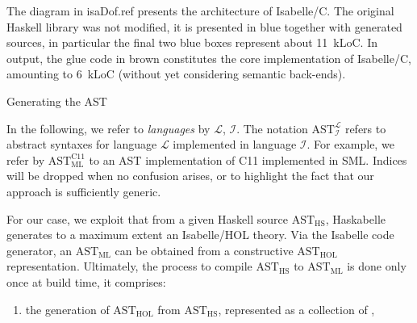 \begin{isabellebody}
\begin{isamarkupfigure*}
\end{isamarkupfigure*}\isamarkuptrue%
%
\begin{isamarkuptext}%
The diagram in \csname isaDof.ref presents the architecture of
Isabelle/C. The original Haskell library was not modified, it is presented in blue together with
generated sources, in particular the final two blue boxes represent about 11~kLoC. In output, the
glue code in brown constitutes the core implementation of Isabelle/C, amounting to 6~kLoC (without
yet considering semantic back-ends).%
\end{isamarkuptext}\isamarkuptrue%
%
\begin{isamarkupsubsection*}%
[label = {arch1},type = {scholarly_paper.technical}, args={label = {arch1},type = {scholarly_paper.technical}, scholarly_paper.text_section.main_author = {@{docitem ''bu''}}, Isa_COL.text_element.level = {}, Isa_COL.text_element.referentiable = {False}, Isa_COL.text_element.variants = {{STR ''outline'', STR ''document''}}, scholarly_paper.text_section.fixme_list = {}, Isa_COL.text_element.level = {}, scholarly_paper.technical.definition_list = {}}]Generating the AST%
\end{isamarkupsubsection*}\isamarkuptrue%
%
\begin{isamarkuptext}%
In the following, we refer to \emph{languages} by $\mathcal{L}$,
$\mathcal{I}$. The notation $\text{AST}^{\mathcal{L}}_{\mathcal{I}}$ refers to abstract syntaxes for
language $\mathcal{L}$ implemented in language $\mathcal{I}$. For example, we refer by
$\text{AST}^{\text{C11}}_{\text{ML}}$ to an AST implementation of C11 implemented in SML. Indices
will be dropped when no confusion arises, or to highlight the fact that our approach is
sufficiently generic.%
\end{isamarkuptext}\isamarkuptrue%
%
\begin{isamarkuptext}%
For our case, we exploit that from a given Haskell source $\text{AST}_{\text{HS}}$,
Haskabelle generates to a maximum extent an Isabelle/HOL theory. Via the Isabelle code generator, an
$\text{AST}_{\text{ML}}$ can be obtained from a constructive $\text{AST}_{\text{HOL}}$
representation. Ultimately, the process to compile $\text{AST}_{\text{HS}}$ to $\text{AST}_{\text{ML}}$
is done only once at build time, it comprises:

%
\begin{enumerate}%
\item the generation of $\text{AST}_{\text{HOL}}$ from $\text{AST}_{\text{HS}}$, represented as a
collection of ,


\end{enumerate}
\end{isamarkuptext}
\end{isabellebody}
